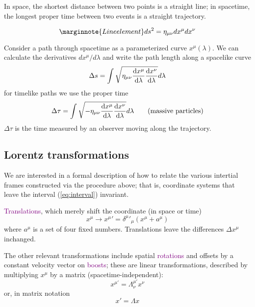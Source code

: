 In space, the shortest distance between two points is a straight line; in spacetime, the longest proper time between two events is a straight trajectory.

\begin{equation}\marginnote{Line element}
    ds^2=\eta_{\mu\nu}dx^\mu dx^\nu
\end{equation}

Consider a path through spacetime as a parameterized curve $x^\mu(\lambda)$. We can calculate the derivatives $dx^\mu/d\lambda$ and write the path length along a spacelike curve
\begin{equation*}
    \Delta s=\int\sqrt{\eta_{\mu\nu}\dv{x^\mu}{\lambda}\dv{x^\nu}{\lambda}}d\lambda
\end{equation*}
for timelike paths we use the proper time
\begin{equation*}
    \Delta \tau = \int\sqrt{-\eta_{\mu\nu}\dv{x^\mu}{\lambda}\dv{x^\nu}{\lambda}}d\lambda\qquad \text{(massive particles)}
\end{equation*}
$\Delta\tau$ is the time measured by an observer moving along the trajectory.

\subsection{Lorentz transformations}
We are interested in a formal description of how to relate the various intertial frames constructed via the procedure above; that is, coordinate systems that leave the interval (\ref{eq:interval}) invariant.

\textcolor{purple}{Translations}, which merely shift the coordinate (in space or time)
    \begin{equation*}
        x^\mu \to x^\mu{'}=\delta^\mu{'}_\mu(x^\mu +a^\mu)
    \end{equation*}
    where $a^\mu$ is a set of four fixed numbers. Translations leave the differences $\Delta x^\mu$ inchanged.

    The other relevant transformations include spatial \textcolor{purple}{rotations} and offsets by a constant velocity vector on \textcolor{purple}{boosts}; these are linear transformations, described by multiplying $x^\mu$ by a matrix (spacetime-independent):
    \begin{equation*}
        x^{\mu'}=\Lambda^{\mu'}_{\nu}x^{\nu}
    \end{equation*}
    or, in matrix notation
    \begin{equation*}
        x'=\Lambda x
    \end{equation*}

